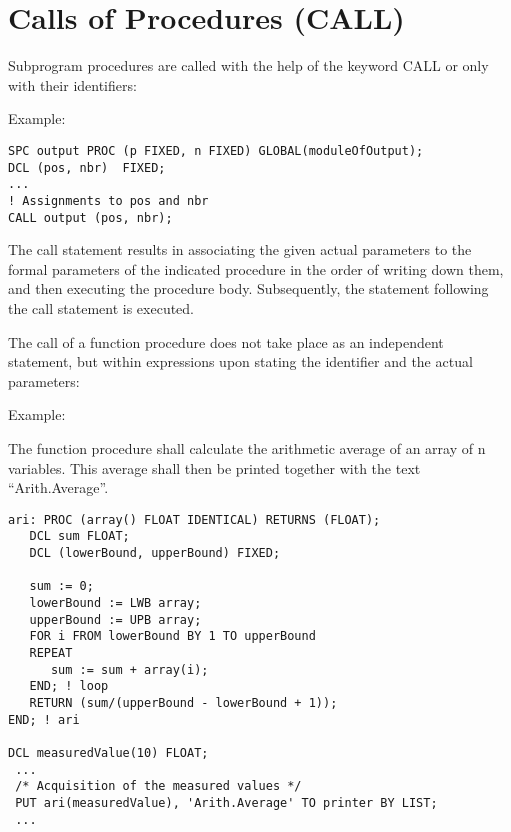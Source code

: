 \section{Calls of Procedures (CALL)}   %
\label{sec_call}

Subprogram procedures are called with the help of the keyword CALL or
only with their identifiers:

\begin{grammarframe} 



\end{grammarframe} 

Example:

\begin{lstlisting}
SPC output PROC (p FIXED, n FIXED) GLOBAL(moduleOfOutput);
DCL (pos, nbr)  FIXED;
...
! Assignments to pos and nbr
CALL output (pos, nbr);
\end{lstlisting}

The call statement results in associating the given actual parameters
to the formal parameters of the indicated procedure in the order of
writing down them, and then executing the procedure body. Subsequently,
the statement following the call statement is executed.

The call of a function procedure does not take place as an independent
statement, but within expressions upon stating the identifier and the
actual parameters:

\begin{grammarframe}

\end{grammarframe}

Example:

The function procedure  shall calculate the arithmetic average of an
array of n  variables. This average shall then be printed together
with the text ``Arith.Average''.

\begin{lstlisting}
ari: PROC (array() FLOAT IDENTICAL) RETURNS (FLOAT);
   DCL sum FLOAT;
   DCL (lowerBound, upperBound) FIXED;

   sum := 0;
   lowerBound := LWB array; 
   upperBound := UPB array; 
   FOR i FROM lowerBound BY 1 TO upperBound
   REPEAT
      sum := sum + array(i);
   END; ! loop
   RETURN (sum/(upperBound - lowerBound + 1));
END; ! ari

DCL measuredValue(10) FLOAT;
 ...
 /* Acquisition of the measured values */ 
 PUT ari(measuredValue), 'Arith.Average' TO printer BY LIST;
 ...
\end{lstlisting}

